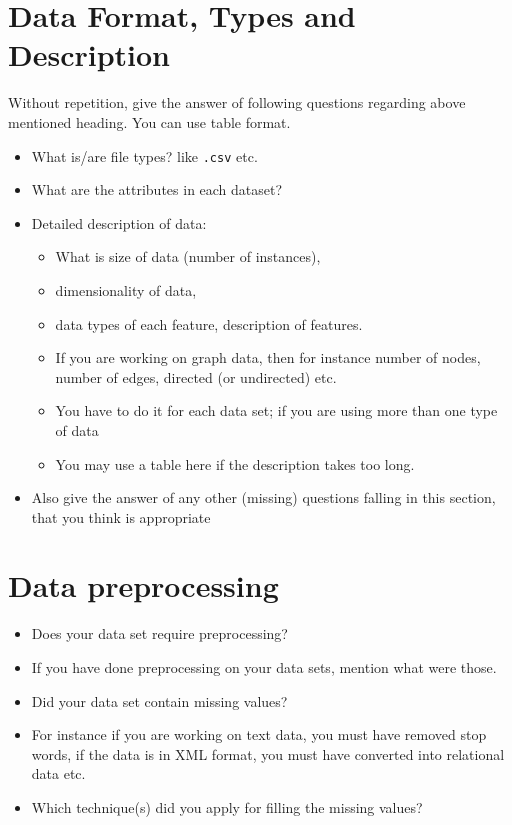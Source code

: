 \documentclass[11pt]{article}
\begin{document}
\section{Data Format, Types and Description}
Without repetition, give the answer of following questions regarding above mentioned heading. You can use table format. 
	\begin{itemize}
		\item What is/are file types? like \texttt{.csv} etc.
		\item What are the attributes in each dataset?

		\item Detailed description of data: 
		\begin{itemize}
			\item What is size of data (number of instances), 
			\item dimensionality of data, 
			\item data types of each feature, description of features. 
			\item If you are working on graph data, then for instance number of nodes, number of edges, directed (or undirected) etc. \item You have to do it for each data set; if you are using more than one type of data
			\item You may use a table here if the description takes too long.
	\end{itemize}
		\item Also give the answer of any other (missing) questions falling in this section, that you think is appropriate
	\end{itemize}

\section{Data preprocessing}
 	\begin{itemize}
 		\item Does your data set require preprocessing?
 		\item If you have done preprocessing on your data sets, mention what were those.
 		\item Did your data set contain missing values?
 		\item For instance if you are working on text data, you must have removed stop words, if the data is in XML format, you must have converted into relational data etc.
 		\item Which technique(s) did you apply for filling the missing values?
 	\end{itemize}  
	
\end{document}

